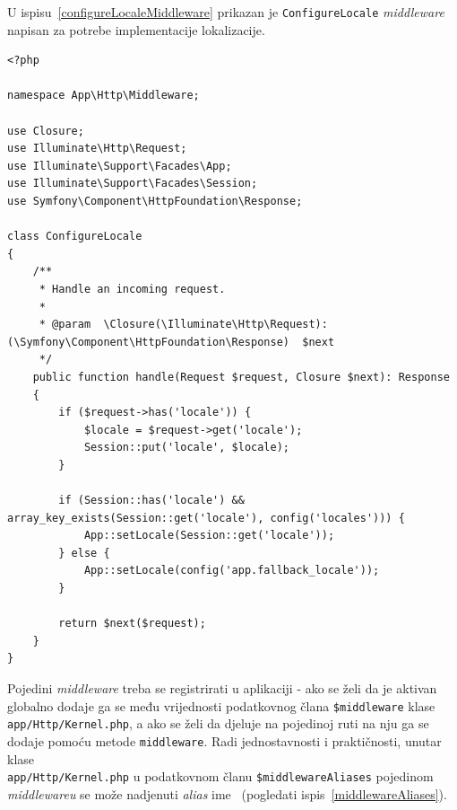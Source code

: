 U ispisu~\ref{configureLocaleMiddleware} prikazan je \texttt{ConfigureLocale} \textit{middleware} napisan za potrebe implementacije lokalizacije.

\begin{lstlisting}[caption={\textit{Middleware} \texttt{ConfigureLocale}}, label=configureLocaleMiddleware]
<?php

namespace App\Http\Middleware;

use Closure;
use Illuminate\Http\Request;
use Illuminate\Support\Facades\App;
use Illuminate\Support\Facades\Session;
use Symfony\Component\HttpFoundation\Response;

class ConfigureLocale
{
    /**
     * Handle an incoming request.
     *
     * @param  \Closure(\Illuminate\Http\Request): (\Symfony\Component\HttpFoundation\Response)  $next
     */
    public function handle(Request $request, Closure $next): Response
    {
        if ($request->has('locale')) {
            $locale = $request->get('locale');
            Session::put('locale', $locale);
        }

        if (Session::has('locale') && array_key_exists(Session::get('locale'), config('locales'))) {
            App::setLocale(Session::get('locale'));
        } else {
            App::setLocale(config('app.fallback_locale'));
        }

        return $next($request);
    }
}

\end{lstlisting}

Pojedini \textit{middleware} treba se registrirati u aplikaciji - ako se želi da je aktivan globalno dodaje ga se među vrijednosti podatkovnog člana \texttt{\$middleware} klase \\ \texttt{app/Http/Kernel.php}, a ako se želi da djeluje na pojedinoj ruti na nju ga se dodaje pomoću metode \texttt{middleware}. Radi jednostavnosti i praktičnosti, unutar klase \\ \texttt{app/Http/Kernel.php} u podatkovnom članu \texttt{\$middlewareAliases} pojedinom \textit{middlewareu} se može nadjenuti \textit{alias} ime~\cite{middleware} (pogledati ispis~\ref{middlewareAliases}).

